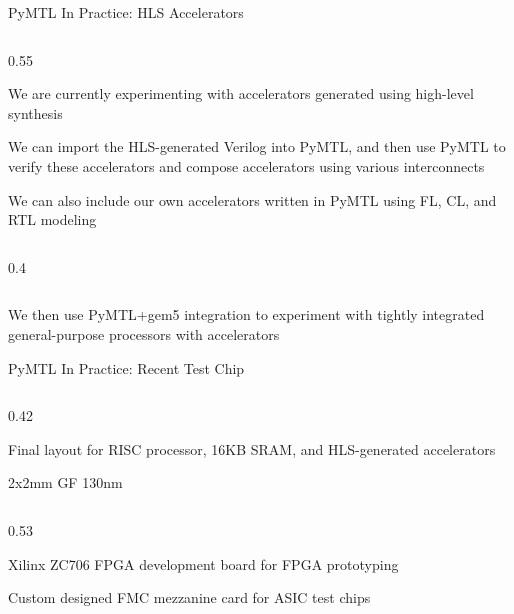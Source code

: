 \begin{frame}{PyMTL In Practice: HLS Accelerators}

  \begin{cbxcols}
  \begin{column}{0.55\tw}

\begin{cbxlist}

  \1 We are currently experimenting with accelerators generated using
     high-level synthesis

  \1 We can import the HLS-generated Verilog into PyMTL, and then use
     PyMTL to verify these accelerators and compose accelerators
     using various interconnects

  \1 We can also include our own accelerators written in PyMTL using FL,
     CL, and RTL modeling

\end{cbxlist}

  \end{column}
  \begin{column}{0.4\tw}


  \end{column}
  \end{cbxcols}

\smallskip
\begin{cbxlist}
  \1 We then use PyMTL+gem5 integration to experiment with tightly
     integrated general-purpose processors with accelerators
\end{cbxlist}

\end{frame}

\begin{frame}{PyMTL In Practice: Recent Test Chip}
\begin{cbxcols}

  \begin{column}{0.42\tw}

    \small\centering

    \smallskip Final layout for RISC processor, 16KB SRAM, and
    HLS-generated accelerators

    \smallskip
    2x2mm GF 130nm
  \end{column}

  \begin{column}{0.53\tw}

    \small\centering

    \smallskip
    Xilinx ZC706 FPGA development board for FPGA prototyping

    \smallskip
    Custom designed FMC mezzanine card for ASIC test chips

  \end{column}

\end{cbxcols}
\end{frame}

